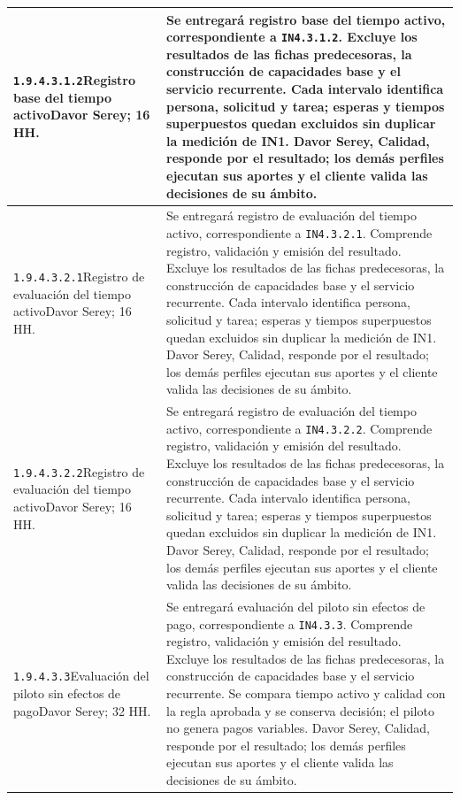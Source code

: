 \begin{longtable}{L{52mm}L{91mm}}
\texttt{1.\allowbreak{}9.\allowbreak{}4.\allowbreak{}3.\allowbreak{}1.\allowbreak{}2}\newline Registro base del tiempo activo\newline Davor Serey; 16 HH. & Se entregará registro base del tiempo activo, correspondiente a \texttt{IN4.3.1.2}. Excluye los resultados de las fichas predecesoras, la construcción de capacidades base y el servicio recurrente.  Cada intervalo identifica persona, solicitud y tarea; esperas y tiempos superpuestos quedan excluidos sin duplicar la medición de IN1. Davor Serey, Calidad, responde por el resultado; los demás perfiles ejecutan sus aportes y el cliente valida las decisiones de su ámbito.\\\hline
\texttt{1.\allowbreak{}9.\allowbreak{}4.\allowbreak{}3.\allowbreak{}2.\allowbreak{}1}\newline Registro de evaluación del tiempo activo\newline Davor Serey; 16 HH. & Se entregará registro de evaluación del tiempo activo, correspondiente a \texttt{IN4.3.2.1}. Comprende registro, validación y emisión del resultado. Excluye los resultados de las fichas predecesoras, la construcción de capacidades base y el servicio recurrente.  Cada intervalo identifica persona, solicitud y tarea; esperas y tiempos superpuestos quedan excluidos sin duplicar la medición de IN1. Davor Serey, Calidad, responde por el resultado; los demás perfiles ejecutan sus aportes y el cliente valida las decisiones de su ámbito.\\\hline
\texttt{1.\allowbreak{}9.\allowbreak{}4.\allowbreak{}3.\allowbreak{}2.\allowbreak{}2}\newline Registro de evaluación del tiempo activo\newline Davor Serey; 16 HH. & Se entregará registro de evaluación del tiempo activo, correspondiente a \texttt{IN4.3.2.2}. Comprende registro, validación y emisión del resultado. Excluye los resultados de las fichas predecesoras, la construcción de capacidades base y el servicio recurrente.  Cada intervalo identifica persona, solicitud y tarea; esperas y tiempos superpuestos quedan excluidos sin duplicar la medición de IN1. Davor Serey, Calidad, responde por el resultado; los demás perfiles ejecutan sus aportes y el cliente valida las decisiones de su ámbito.\\\hline
\texttt{1.\allowbreak{}9.\allowbreak{}4.\allowbreak{}3.\allowbreak{}3}\newline Evaluación del piloto sin efectos de pago\newline Davor Serey; 32 HH. & Se entregará evaluación del piloto sin efectos de pago, correspondiente a \texttt{IN4.3.3}. Comprende registro, validación y emisión del resultado. Excluye los resultados de las fichas predecesoras, la construcción de capacidades base y el servicio recurrente.  Se compara tiempo activo y calidad con la regla aprobada y se conserva decisión; el piloto no genera pagos variables. Davor Serey, Calidad, responde por el resultado; los demás perfiles ejecutan sus aportes y el cliente valida las decisiones de su ámbito.\\\hline

\end{longtable}
